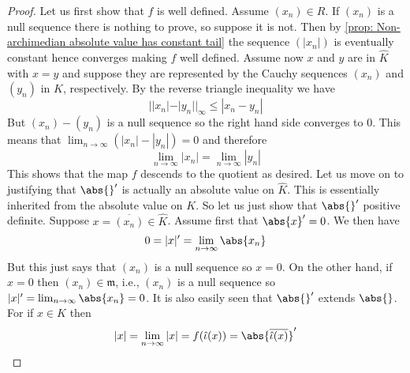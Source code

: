 \documentclass{article}
\newcommand{\mfrak}[1]{\mathfrak{#1}}
\numberwithin{equation}{section}
\begin{document}
\begin{proof}
	Let us first show that $f$ is well defined. Assume $(x_n) \in R$. If $(x_n)$ is a null sequence there is nothing to prove, so suppose it is not. Then by \cref{prop: Non-archimedian absolute value has constant tail} the sequence $(|x_n|)$ is eventually constant hence converges making $f$ well defined. Assume now $x$ and $y$ are in $\hat K$ with $x = y$ and suppose they are represented by the Cauchy sequences $(x_n)$ and $(y_n)$ in $K$, respectively. By the reverse triangle inequality we have
	$$||x_n| - |y_n| |_\infty \leq |x_n - y_n|$$
	But $(x_n) - (y_n)$ is a null sequence so the right hand side converges to 0. This means that $\lim_{n \to \infty} (|x_n| - |y_n|) = 0$ and therefore $$\lim_{n \to \infty} |x_n| = \lim_{n \to \infty}|y_n|$$
	This shows that the map $f$ descends to the quotient as desired.
	Let us move on to justifying that $\abs{}'$ is actually an absolute value on $\hat K$. This is essentially inherited from the absolute value on $K$. So let us just show that $\abs{}'$ positive definite. Suppose $x = \overline {(x_n)} \in \hat K$. Assume first that $\abs{x}' = 0$. We then have
	$$0 = |x|' = \lim_{n \to \infty} \abs{x_n}$$
	But this just says that $(x_n)$ is a null sequence so $x = 0$. On the other hand, if $x = 0$ then $(x_n) \in \mfrak m$, i.e., $(x_n)$ is a null sequence so $|x|' =\lim_{n \to \infty} \abs{x_n} = 0$. It is also easily seen that $\abs{}'$ extends $\abs{}$. For if $x \in K$ then
	$$|x| = \lim_{n \to \infty} |x| = f(\hat \iota (x)) = \abs{\overline{ \hat \iota (x)}}'$$


\end{proof}
\end{document}
